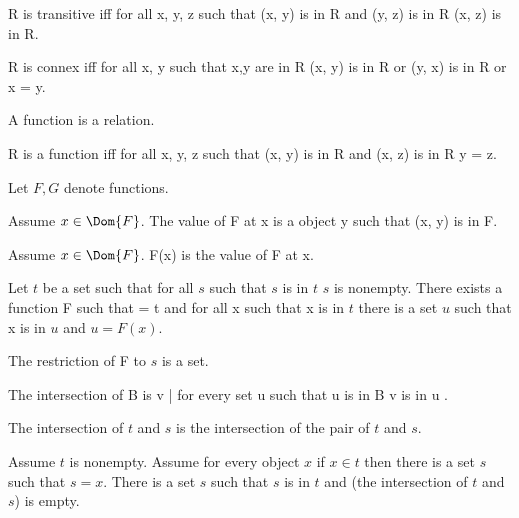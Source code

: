 \documentclass{article}
\begin{document}
\begin{forthel}
    \begin{definition}
      R is transitive iff for all x, y, z such that (x, y) is in R and (y, z) is in R (x, z) is in R.
    \end{definition}

    \begin{definition}
      R is connex iff for all x, y such that x,y are in R
        (x, y) is in R or (y, x) is in R or x = y.
    \end{definition}

    \begin{signature}
      A function is a relation.
    \end{signature}

    \begin{axiom}[FunctionIntro]
      R is a function iff for all x, y, z such that (x, y) is in R and (x, z) is in R y = z.
    \end{axiom}

    Let $F, G$ denote functions.

    \begin{definition}
      Assume $x \in \Dom{F}$.
      The value of F at x is a object y such that (x, y) is in F.
    \end{definition}

    \begin{definition}
      Assume $x \in \Dom{F}$.
      F(x) is the value of F at x.
    \end{definition}

    \begin{axiom}[Choice]
      Let $t$ be a set such that for all $s$ such that $s$ is in $t$ $s$ is nonempty.
        There exists a function F such that  = t
        and for all x such that x is in $t$ there is a set $u$ such that x is in $u$ and $u = F(x)$.
    \end{axiom}

    \begin{axiom}[Replacement]
      The restriction of F to $s$ is a set.
    \end{axiom}

    \begin{definition}
      The intersection of B is { v | for every set u such that u is in B v is in u }.
    \end{definition}

    \begin{definition}
      The intersection of $t$ and $s$ is the intersection of the pair of $t$ and $s$.
    \end{definition}

    \begin{axiom}[Foundation]
      Assume $t$ is nonempty.
      Assume for every object $x$ if $x \in t$
        then there is a set $s$ such that $s = x$.
      There is a set $s$ such that $s$ is in $t$ and
         (the intersection of $t$ and $s$) is empty.
    \end{axiom}
  \end{forthel}
\end{document}
